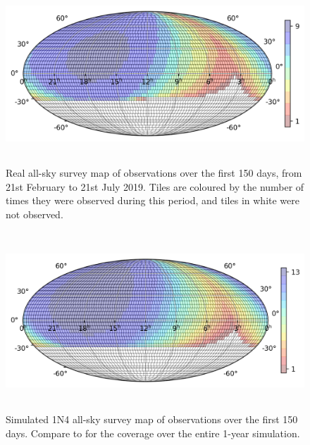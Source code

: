 \begin{colsection}
\begin{colsection}
\begin{figure}[p]
    \begin{center}
        \includegraphics[height=190pt]{images/survey_sims/150_1N4_real.png}
    \end{center}
    \caption[Real survey observations over 150 days]{
        Real all-sky survey map of observations over the first 150 days, from 21st February to 21st July 2019. Tiles are coloured by the number of times they were observed during this period, and tiles in white were not observed.
    }\label{fig:survey_real_150}
\end{figure}

\begin{figure}[p]
    \begin{center}
        \includegraphics[height=190pt]{images/survey_sims/150_1N4_lite.png}
    \end{center}
    \caption[1N4 survey simulation observations over 150 days]{
        Simulated 1N4 all-sky survey map of observations over the first 150 days. Compare to  for the coverage over the entire 1-year simulation.
    }\label{fig:survey_sim_1n4_150}
\end{figure}

\clearpage


\end{colsection}
\end{colsection}
